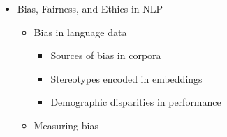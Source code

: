 \documentclass[
]{article}
\providecommand{\tightlist}{%
  \setlength{\itemsep}{0pt}\setlength{\parskip}{0pt}}
\begin{document}
\begin{itemize}
\begin{itemize}
    \begin{itemize}
    \tightlist
    \item
      \texttt{mBERT}, \texttt{XLM-RoBERTa}, \texttt{mT5}
    \item
      Cross-lingual transfer
    \item
      Curse of multilinguality
    \end{itemize}
  \item
    Low-resource techniques

    \begin{itemize}
    \tightlist
    \item
      Cross-lingual transfer learning
    \item
      Data augmentation through translation
    \item
      Distant supervision
    \item
      Active learning for annotation
    \end{itemize}
  \item
    Code-switching and mixed text

    \begin{itemize}
    \tightlist
    \item
      Detection and tokenization
    \item
      Modeling considerations
    \end{itemize}
  \item
    Writing systems

    \begin{itemize}
    \tightlist
    \item
      Logographic, syllabic, alphabetic, abugida
    \item
      Script normalization
    \item
      Romanization and transliteration
    \end{itemize}
  \end{itemize}
\item
  Bias, Fairness, and Ethics in NLP

  \begin{itemize}
  \tightlist
  \item
    Bias in language data

    \begin{itemize}
    \tightlist
    \item
      Sources of bias in corpora
    \item
      Stereotypes encoded in embeddings
    \item
      Demographic disparities in performance
    \end{itemize}
  \item
    Measuring bias


\end{itemize}
\end{itemize}
\end{document}
